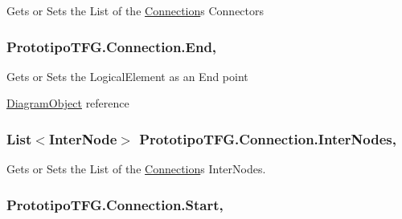 Gets or Sets the List of the \hyperlink{class_prototipo_t_f_g_1_1_connection}{Connection}\textquotesingle{}s Connectors 

\hypertarget{class_prototipo_t_f_g_1_1_connection_ab6be67647088f3becda41f2adda4bcd3}{}
\subsubsection[{End}]{ Prototipo\+T\+F\+G.\+Connection.\+End\hspace{0.3cm}{\ttfamily [get]}, {\ttfamily [set]}}\label{class_prototipo_t_f_g_1_1_connection_ab6be67647088f3becda41f2adda4bcd3}


Gets or Sets the Logical\+Element as an End point 

\hyperlink{class_prototipo_t_f_g_1_1_diagram_object}{Diagram\+Object} reference\hypertarget{class_prototipo_t_f_g_1_1_connection_a7ccb8eb00691cd80d7650a0bb70d76db}{}
\subsubsection[{Inter\+Nodes}]{\setlength{\rightskip}{0pt plus 5cm}List$<${\bf Inter\+Node}$>$ Prototipo\+T\+F\+G.\+Connection.\+Inter\+Nodes\hspace{0.3cm}{\ttfamily [get]}, {\ttfamily [set]}}\label{class_prototipo_t_f_g_1_1_connection_a7ccb8eb00691cd80d7650a0bb70d76db}


Gets or Sets the List of the \hyperlink{class_prototipo_t_f_g_1_1_connection}{Connection}\textquotesingle{}s Inter\+Nodes. 

\hypertarget{class_prototipo_t_f_g_1_1_connection_a9b681bd0aa7edc362b2a6f726ed460d9}{}
\subsubsection[{Start}]{ Prototipo\+T\+F\+G.\+Connection.\+Start\hspace{0.3cm}{\ttfamily [get]}, {\ttfamily [set]}}\label{class_prototipo_t_f_g_1_1_connection_a9b681bd0aa7edc362b2a6f726ed460d9}


